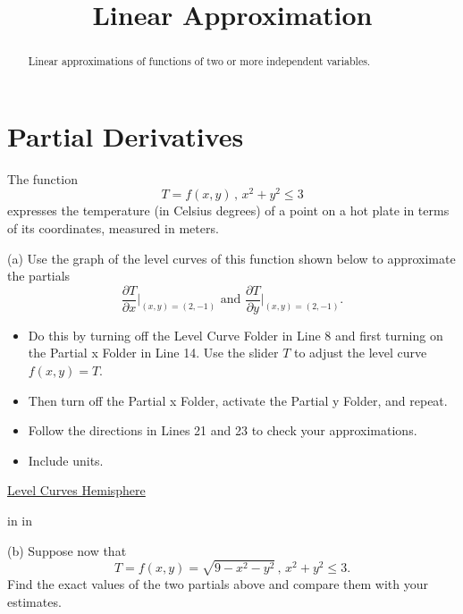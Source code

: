 \documentclass{ximera}
\title{Linear Approximation}
\newcommand{\pskip}{\vskip 0.1 in}
\begin{document}
\begin{abstract}
Linear approximations of functions of two or more independent variables.
\end{abstract}
\maketitle


\section{Partial Derivatives}

\begin{example}  \label{Edgtr543}

The function
\[
    T = f(x,y) \, , \, x^2 + y^2 \leq 3
\]
expresses the temperature (in Celsius degrees) of a point on a hot plate in terms of its coordinates, measured in meters. 

(a) Use the graph of the level curves of this function shown below to approximate the partials 
\[
    \frac{\partial T}{\partial x}\Big|_{(x,y)=(2,-1)} \text{ and } \frac{\partial T}{\partial y}\Big|_{(x,y)=(2,-1)} .
\]

\begin{itemize}
\item{Do this by turning off the Level Curve Folder in Line 8 and first turning on the Partial x Folder in Line 14. Use the slider $T$ to adjust the level curve $f(x,y)=T$.} 

\item{Then turn off the Partial x Folder, activate the Partial y Folder, and repeat.}

\item{Follow the directions in Lines 21 and 23 to check your approximations.}

\item{Include units.}

\end{itemize}

 
\begin{onlineOnly}
    \begin{center}
\end{center}
\end{onlineOnly}

\href{https://www.desmos.com/calculator/et6f10fnti}{Level Curves Hemisphere}

\pskip \pskip

(b) Suppose now that 
\[
    T = f(x,y) = \sqrt{9-x^2-y^2} \, , \, x^2 + y^2 \leq 3 .
\]
Find the exact values of the two partials above and compare them with your estimates.

\end{example}
\end{document}
